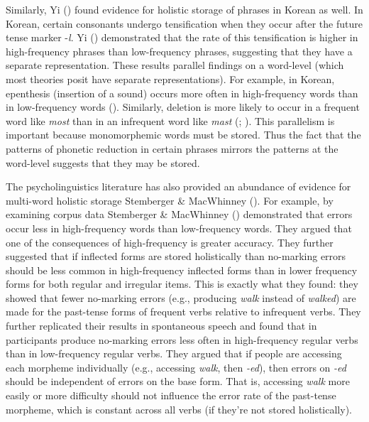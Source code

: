 \documentclass[
  12pt,
  letterpaper,
]{scrreport}
\begin{document}
Similarly, Yi () found evidence for
holistic storage of phrases in Korean as well. In Korean, certain
consonants undergo tensification when they occur after the future tense
marker -\emph{l}. Yi () demonstrated
that the rate of this tensification is higher in high-frequency phrases
than low-frequency phrases, suggesting that they have a separate
representation. These results parallel findings on a word-level (which
most theories posit have separate representations). For example, in
Korean, epenthesis (insertion of a sound) occurs more often in
high-frequency words than in low-frequency words
(). Similarly, deletion is more likely to occur in a
frequent word like \emph{most} than in an infrequent word like
\emph{mast} (;
). This parallelism is important because monomorphemic words must
be stored. Thus the fact that the patterns of phonetic reduction in
certain phrases mirrors the patterns at the word-level suggests that
they may be stored.

The psycholinguistics literature has also provided an abundance of
evidence for multi-word holistic storage Stemberger \& MacWhinney
(). For
example, by examining corpus data Stemberger \& MacWhinney
()
demonstrated that errors occur less in high-frequency words than
low-frequency words. They argued that one of the consequences of
high-frequency is greater accuracy. They further suggested that if
inflected forms are stored holistically than no-marking errors should be
less common in high-frequency inflected forms than in lower frequency
forms for both regular and irregular items. This is exactly what they
found: they showed that fewer no-marking errors (e.g., producing
\emph{walk} instead of \emph{walked}) are made for the past-tense forms
of frequent verbs relative to infrequent verbs. They further replicated
their results in spontaneous speech and found that in participants
produce no-marking errors less often in high-frequency regular verbs
than in low-frequency regular verbs. They argued that if people are
accessing each morpheme individually (e.g., accessing \emph{walk}, then
\emph{-ed}), then errors on \emph{-ed} should be independent of errors
on the base form. That is, accessing \emph{walk} more easily or more
difficulty should not influence the error rate of the past-tense
morpheme, which is constant across all verbs (if they're not stored
holistically).
\end{document}
